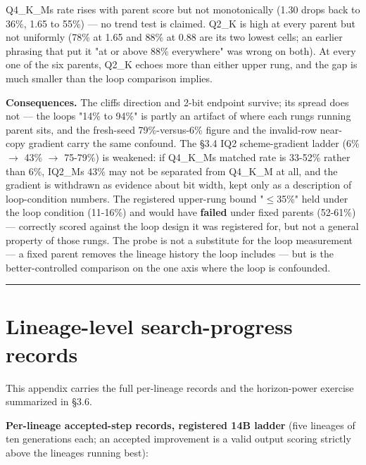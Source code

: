 Q4\_K\_M\textquotesingle s rate rises with parent score but not monotonically (1.30 drops back to 36\%, 1.65 to 55\%) --- no trend test is claimed. Q2\_K is high at every parent but not uniformly (78\% at 1.65 and 88\% at 0.88 are its two lowest cells; an earlier phrasing that put it "at or above 88\% everywhere" was wrong on both). At every one of the six parents, Q2\_K echoes more than either upper rung, and the gap is much smaller than the loop comparison implies.

\textbf{Consequences.} The cliff\textquotesingle s direction and 2-bit endpoint survive; its spread does not --- the loop\textquotesingle s "14\% to 94\%" is partly an artifact of where each rung\textquotesingle s running parent sits, and the fresh-seed 79\%-versus-6\% figure and the invalid-row near-copy gradient carry the same confound. The §3.4 IQ2 scheme-gradient ladder (6\% \(\rightarrow\) 43\% \(\rightarrow\) 75-79\%) is weakened: if Q4\_K\_M\textquotesingle s matched rate is 33-52\% rather than 6\%, IQ2\_M\textquotesingle s 43\% may not be separated from Q4\_K\_M at all, and the gradient is withdrawn as evidence about bit width, kept only as a description of loop-condition numbers. The registered upper-rung bound "\(\leq\)35\%" held under the loop condition (11-16\%) and would have \textbf{failed} under fixed parents (52-61\%) --- correctly scored against the loop design it was registered for, but not a general property of those rungs. The probe is not a substitute for the loop measurement --- a fixed parent removes the lineage history the loop includes --- but is the better-controlled comparison on the one axis where the loop is confounded.

\begin{center}\rule{0.5\linewidth}{0.5pt}\end{center}

\hypertarget{lineage-level-search-progress-records}{%
\section{Lineage-level search-progress records}\label{lineage-level-search-progress-records}}

This appendix carries the full per-lineage records and the horizon-power exercise summarized in §3.6.

\textbf{Per-lineage accepted-step records, registered 14B ladder} (five lineages of ten generations each; an accepted improvement is a valid output scoring strictly above the lineage\textquotesingle s running best):

